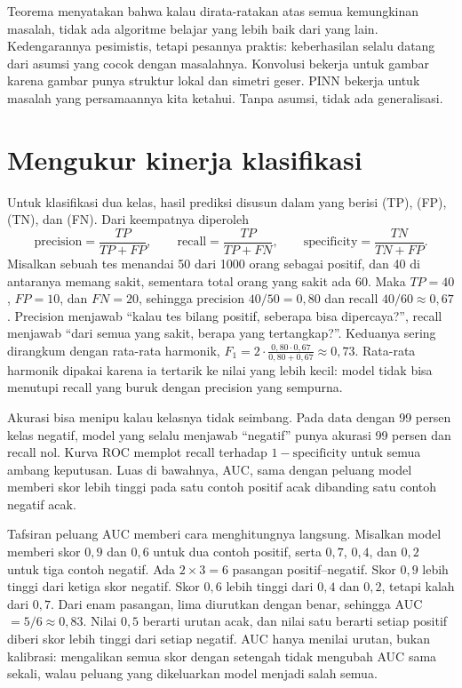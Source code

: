 Teorema  \citep{wolpert1996} menyatakan bahwa kalau dirata-ratakan atas semua
kemungkinan masalah, tidak ada algoritme belajar yang lebih baik dari yang lain. Kedengarannya
pesimistis, tetapi pesannya praktis: keberhasilan selalu datang dari asumsi yang cocok dengan
masalahnya. Konvolusi bekerja untuk gambar karena gambar punya struktur lokal dan simetri geser.
PINN bekerja untuk masalah yang persamaannya kita ketahui. Tanpa asumsi, tidak ada
generalisasi.

\section{Mengukur kinerja klasifikasi}

Untuk klasifikasi dua kelas, hasil prediksi disusun dalam  yang berisi
 (TP),  (FP),  (TN), dan
 (FN). Dari keempatnya diperoleh
\[
\text{precision}=\frac{TP}{TP+FP},\qquad
\text{recall}=\frac{TP}{TP+FN},\qquad
\text{specificity}=\frac{TN}{TN+FP}.
\]
Misalkan sebuah tes menandai 50 dari 1000 orang sebagai positif, dan 40 di antaranya memang sakit,
sementara total orang yang sakit ada 60. Maka $TP=40$, $FP=10$, dan $FN=20$, sehingga precision
$40/50=0{,}80$ dan recall $40/60\approx0{,}67$. Precision menjawab ``kalau tes bilang positif, seberapa
bisa dipercaya?'', recall menjawab ``dari semua yang sakit, berapa yang tertangkap?''. Keduanya sering
dirangkum dengan rata-rata harmonik, $F_1=2\cdot\frac{0{,}80\cdot0{,}67}{0{,}80+0{,}67}\approx0{,}73$.
Rata-rata harmonik dipakai karena ia tertarik ke nilai yang lebih kecil: model tidak bisa menutupi
recall yang buruk dengan precision yang sempurna.

Akurasi bisa menipu kalau kelasnya tidak seimbang. Pada data dengan 99 persen kelas negatif,
model yang selalu menjawab ``negatif'' punya akurasi 99 persen dan recall nol. Kurva ROC
memplot recall terhadap $1-\text{specificity}$ untuk semua ambang keputusan. Luas di bawahnya,
AUC, sama dengan peluang model memberi skor lebih tinggi pada satu contoh positif acak dibanding
satu contoh negatif acak.

Tafsiran peluang AUC memberi cara menghitungnya langsung. Misalkan model memberi skor $0{,}9$ dan $0{,}6$ untuk dua contoh
positif, serta $0{,}7$, $0{,}4$, dan $0{,}2$ untuk tiga contoh negatif. Ada $2\times3=6$ pasangan positif--negatif. Skor $0{,}9$
lebih tinggi dari ketiga skor negatif. Skor $0{,}6$ lebih tinggi dari $0{,}4$ dan $0{,}2$, tetapi kalah dari $0{,}7$. Dari enam
pasangan, lima diurutkan dengan benar, sehingga AUC $=5/6\approx0{,}83$. Nilai $0{,}5$ berarti urutan acak, dan nilai satu
berarti setiap positif diberi skor lebih tinggi dari setiap negatif. AUC hanya menilai urutan, bukan kalibrasi: mengalikan
semua skor dengan setengah tidak mengubah AUC sama sekali, walau peluang yang dikeluarkan model menjadi salah semua.

